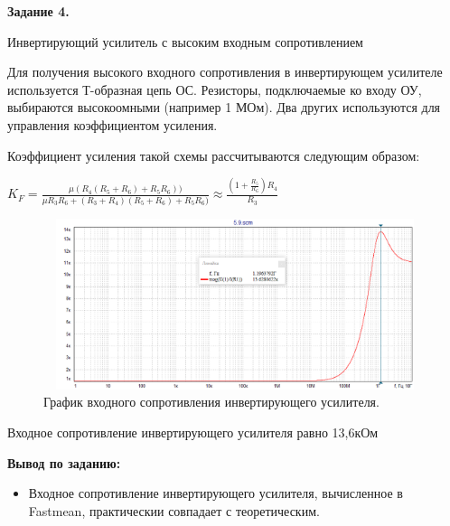 \documentclass[a4paper,14pt]{extarticle}
\begin{document}
    \begin{center}
        \textbf{Задание 4.}
    \end{center}

    Инвертирующий усилитель с высоким входным сопротивлением
    
    Для получения высокого входного сопротивления в инвертирующем 
    усилителе используется Т-образная цепь ОС. Резисторы, подключаемые ко
    входу ОУ, выбираются высокоомными (например 1 МОм). Два других
    используются для управления коэффициентом усиления.

    Коэффициент усиления такой схемы рассчитываются следующим образом:

    \begin{center}
        $K_F=\frac{\mu(R_4(R_5+R_6)+R_5R_6))}{\mu R_3R_6+(R_3+R_4)(R_5+R_6)+R_5R_6)}\approx \frac{(1+\frac{R_5}{R_6})R_4}{R_3}$
    \end{center}
    \begin{figure}[h!]
        \begin{center}
            \includegraphics[width=15cm,height=5cm]{10.png}
        \end{center}
        \caption{График входного сопротивления инвертирующего усилителя.}
    \end{figure}

    Входное сопротивление инвертирующего усилителя равно 13,6кОм

    \textbf{Вывод по заданию:}

    \begin{itemize}
        \item Входное сопротивление инвертирующего усилителя, вычисленное в Fastmean, практическии совпадает с теоретическим.
    \end{itemize}
\end{document}
